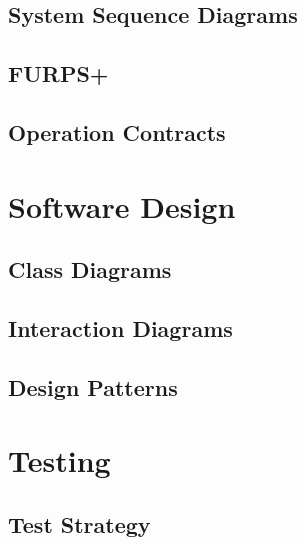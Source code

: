\documentclass[a4paper,11pt]{article}
\begin{document}
\subsection{System Sequence Diagrams}


\subsection{FURPS+}


\subsection{Operation Contracts}


\pagebreak
\section{Software Design}


\subsection{Class Diagrams}


\subsection{Interaction Diagrams}


\subsection{Design Patterns}



\pagebreak

\pagebreak %


\pagebreak
\section{Testing}


\subsection{Test Strategy}

\end{document}
